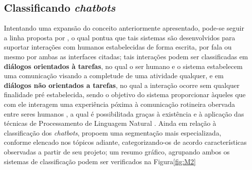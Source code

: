 \subsection{Classificando \textit{chatbots}}
Intentando uma expansão do conceito anteriormente apresentado, pode-se seguir a linha proposta por , o qual pontua que tais sistemas são desenvolvidos para suportar interações com humanos estabelecidas de forma escrita, por fala ou mesmo por ambas as interfaces citadas; tais interações podem ser classificadas em \textbf{diálogos orientados à tarefas}, no qual o ser humano e o sistema estabelecem uma comunicação visando a completude de uma atividade qualquer, e em \textbf{diálogos não orientados a tarefas}, no qual a interação ocorre sem qualquer finalidade pré estabelecida, sendo o objetivo do sistema proporcionar àqueles que com ele interagem uma experiência póxima à comunicação rotineira obervada entre seres humanos \cite{wezel2020m}, a qual é possibilitada graças à existência e à aplicação das técnicas de Processamento de Linguagem Natural \cite{lokman2018modern}. Ainda em relação à classificação dos \textit{chatbots},  propoem uma segmentação mais especializada, conforme elencado nos tópicos adiante, categorizando-os de acordo características observadas a partir de seu projeto; um resumo gráfico, agrupando ambos os sistemas de classificação podem ser verificados na Figura\ref{fig:M2}

